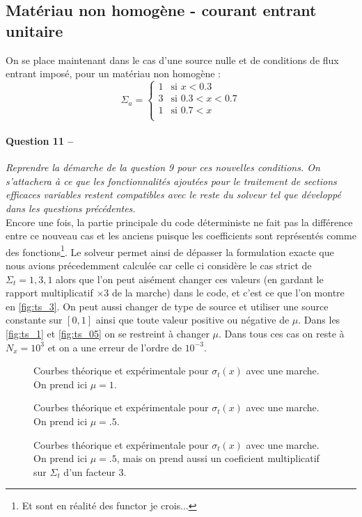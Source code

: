 \documentclass[11pt,a4paper]{article}
\newcommand{\question}[2]{\paragraph{Question #1 --}\hspace{-7pt}\textit{#2} \\}
\begin{document}
 \subsection{Matériau non homogène - courant entrant unitaire}
 
 On se place maintenant dans le cas d'une source nulle et de conditions de flux entrant imposé, pour un matériau non homogène :
\begin{equation}
  \Sigma_a =
  \begin{cases}
    1 &\mbox{si } x<0.3 \\
    3 &\mbox{si } 0.3<x<0.7 \\
    1 &\mbox{si } 0.7<x \\
  \end{cases}
\end{equation}

\question{11}{Reprendre la démarche de la question 9 pour ces nouvelles conditions.
  On s'attachera à ce que les fonctionnalités ajoutées pour le traitement de sections efficaces variables restent compatibles avec le reste du solveur tel que développé dans les questions précédentes.}

Encore une fois, la partie principale du code déterministe ne fait pas la différence entre ce nouveau cas et les anciens puisque les coefficients sont représentés comme des fonctions\footnote{Et sont en réalité des functor je crois...}. Le solveur permet ainsi de dépasser la formulation exacte que nous avions précedemment calculée car celle ci considère le cas strict de $\Sigma_t=1, 3, 1$ alors que l'on peut aisément changer ces valeurs (en gardant le rapport multiplicatif $\times3$ de la marche) dans le code, et c'est ce que l'on montre en \autoref{fig:ts_3}. On peut aussi changer de type de source et utiliser une source constante sur $[0,1]$ ainsi que toute valeur positive ou négative de $\mu$. Dans les \autoref{fig:ts_1} et \autoref{fig:ts_05} on se restreint à changer $\mu$. Dans tous ces cas on reste à $N_x=10^3$ et on a une erreur de l'ordre de $10^{-3}$.
\begin{figure}
  \centering
  
  \caption{Courbes théorique et expérimentale pour $\sigma_t(x)$ avec une marche. On prend ici $\mu=1$. }
  \label{fig:ts_1}
\end{figure}
\begin{figure}
  \centering
  
  \caption{Courbes théorique et expérimentale pour $\sigma_t(x)$ avec une marche. On prend ici $\mu=.5$. }
  \label{fig:ts_05}
\end{figure}
\begin{figure}
  \centering
  
  \caption{Courbes théorique et expérimentale pour $\sigma_t(x)$ avec une marche. On prend ici $\mu=.5$, mais on prend aussi un coeficient multiplicatif sur $\Sigma_t$ d'un facteur $3$. }
  \label{fig:ts_3}
\end{figure}
\end{document}
